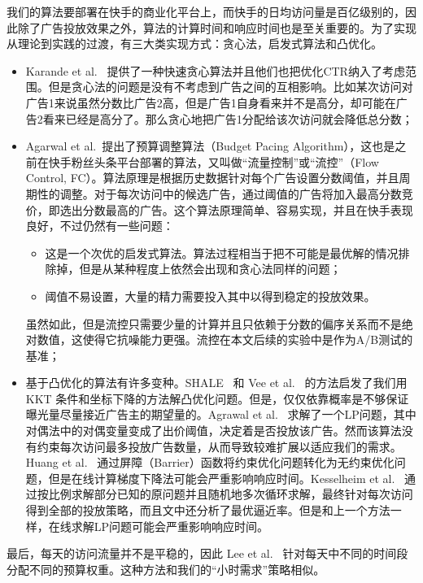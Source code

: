 我们的算法要部署在快手的商业化平台上，而快手的日均访问量是百亿级别的，因此除了广告投放效果之外，算法的计算时间和响应时间也是至关重要的。为了实现从理论到实践的过渡，有三大类实现方式：贪心法，启发式算法和凸优化。
\begin{itemize}
	\item Karande et al.~\cite{karande2013optimizing} 提供了一种快速贪心算法并且他们也把优化CTR纳入了考虑范围。但是贪心法的问题是没有不考虑到广告之间的互相影响。比如某次访问对广告1来说虽然分数比广告2高，但是广告1自身看来并不是高分，却可能在广告2看来已经是高分了。那么贪心地把广告1分配给该次访问就会降低总分数；
	\item Agarwal et al.~\cite{agarwal2014budget}提出了预算调整算法（Budget Pacing Algorithm），这也是之前在快手粉丝头条平台部署的算法，又叫做“流量控制”或“流控”（Flow Control, FC）。算法原理是根据历史数据针对每个广告设置分数阈值，并且周期性的调整。对于每次访问中的候选广告，通过阈值的广告将加入最高分数竞价，即选出分数最高的广告。这个算法原理简单、容易实现，并且在快手表现良好，不过仍然有一些问题：
	\begin{itemize}[*]
		\item 这是一个次优的启发式算法。算法过程相当于把不可能是最优解的情况排除掉，但是从某种程度上依然会出现和贪心法同样的问题；
		\item 阈值不易设置，大量的精力需要投入其中以得到稳定的投放效果。
	\end{itemize}
	虽然如此，但是流控只需要少量的计算并且只依赖于分数的偏序关系而不是绝对数值，这使得它抗噪能力更强。流控在本文后续的实验中是作为A/B测试的基准；
	\item 基于凸优化的算法有许多变种。SHALE~\cite{bharadwaj2012shale} 和 Vee et al.~\cite{Vee2010Optimal} 的方法启发了我们用 KKT 条件和坐标下降的方法解凸优化问题。但是，仅仅依靠概率是不够保证曝光量尽量接近广告主的期望量的。Agrawal et al.~\cite{agrawal2014dynamic} 求解了一个LP问题，其中对偶法中的对偶变量变成了出价阈值，决定着是否投放该广告。然而该算法没有约束每次访问最多投放广告数量，从而导致较难扩展以适应我们的需求。Huang et al.~\cite{huang2016online} 通过屏障（Barrier）函数将约束优化问题转化为无约束优化问题，但是在线计算梯度下降法可能会严重影响响应时间。Kesselheim et al.~\cite{kesselheim2014primal} 通过按比例求解部分已知的原问题并且随机地多次循环求解，最终针对每次访问得到全部的投放策略，而且文中还分析了最优逼近率。但是和上一个方法一样，在线求解LP问题可能会严重影响响应时间。
\end{itemize}
最后，每天的访问流量并不是平稳的，因此 Lee et al.~\cite{lee2013real} 针对每天中不同的时间段分配不同的预算权重。这种方法和我们的“小时需求”策略相似。

